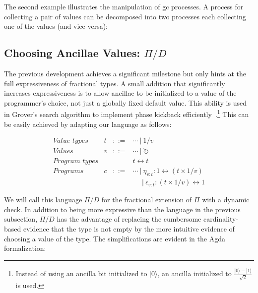 \documentclass[sigplan,10pt,review,anonymous]{acmart}
\newcommand{\alt}{~|~}
\newcommand{\gcv}{\circlearrowright}
\newcommand{\ket}[1]{|#1\rangle}
\newcommand{\oneover}[1]{1/#1}
\begin{document}
\EtaEpsilonExampleone{}

The second example illustrates the manipulation of gc processes. A
process for collecting a pair of values can be decomposed into two
processes each collecting one of the values (and vice-versa):

\EtaEpsilonExampletwo{}

\subsection{Choosing Ancillae Values: $\Pi/D$}

The previous development achieves a significant milestone but only
hints at the full expressiveness of fractional types. A small addition
that significantly increases expressiveness is to allow ancillae to be
initialized to a value of the programmer's choice, not just a globally
fixed default value. This ability is used in Grover's search algorithm
to implement phase kickback
efficiently~\cite{howgrover}.\footnote{Instead of using an ancilla bit
  initialized to $\ket{0}$, an ancilla initialized to
  $\frac{\ket{0}-\ket{1}}{\sqrt{2}}$ is used.} This can be easily
achieved by adapting our language as follows:

\[\begin{array}{lrcl}
\textit{Value types} & t &::=& \cdots \alt \oneover{v} \\
\textit{Values}      & v &::=& \cdots \alt \gcv \\
\textit{Program types} &&& t \leftrightarrow t \\
\textit{Programs} & c &::=& \cdots \alt
   \eta_{v:t} : 1 \leftrightarrow (t \times \oneover{v}) \\
   &&& ~~~~~\alt \epsilon_{v:t} : (t \times \oneover{v}) \leftrightarrow 1
\end{array}\]

We will call this language $\Pi/D$ for the fractional extension of
$\Pi$ with a dynamic check. In addition to being more expressive than
the language in the previous subsection, $\Pi/D$ has the advantage of
replacing the cumbersome cardinality-based evidence that the type is
not empty by the more intuitive evidence of choosing a value of the
type. The simplifications are evident in the Agda formalization:

\PIFDUdef{}

\vspace{-\baselineskip}

\PIFDCombdef{}

\vspace{-\baselineskip}
\end{document}
